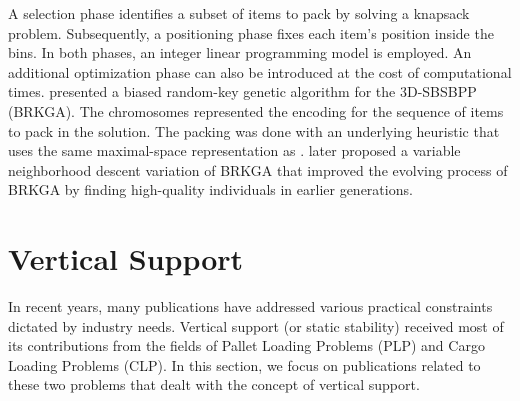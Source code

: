 A selection phase identifies a subset of items to pack by solving a knapsack problem. Subsequently, a positioning phase fixes each item's position inside the bins.
In both phases, an integer linear programming model is employed. An additional optimization phase can also be introduced at the cost of computational times.
\cite{gonccalves2013biased} presented a biased random-key genetic algorithm for the 3D-SBSBPP (BRKGA).
The chromosomes represented the encoding for the sequence of items to pack in the solution.
The packing was done with an underlying heuristic that uses the same maximal-space representation as \cite{parreno2010hybrid}.
\cite{zudio2018brkga} later proposed a variable neighborhood descent variation of BRKGA that improved the evolving process of BRKGA by finding high-quality individuals in earlier generations.


\section{Vertical Support}
\label{sec:literature:support}%
In recent years, many publications have addressed various practical constraints dictated by industry needs.
Vertical support (or static stability) received most of its contributions from the fields of Pallet Loading Problems (PLP) and Cargo Loading Problems (CLP).
In this section, we focus on publications related to these two problems that dealt with the concept of vertical support.

